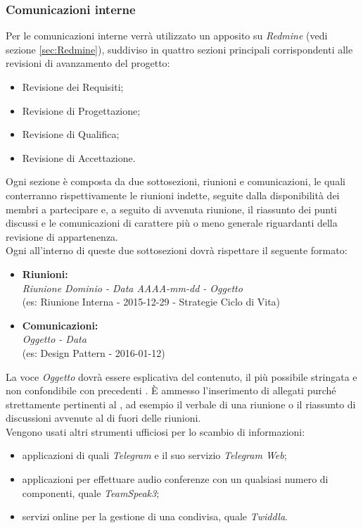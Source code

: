 \documentclass{scalatekids-article}
\begin{document}
\subsubsection{Comunicazioni interne}
\label{sec:ComunicazioniInterne}
Per le comunicazioni interne verrà utilizzato un  apposito su
\textit{Redmine} (vedi sezione \ref{sec:Redmine}), suddiviso in quattro sezioni
principali corrispondenti alle revisioni di avanzamento del progetto:
\begin{itemize}
\item Revisione dei Requisiti;
\item Revisione di Progettazione;
\item Revisione di Qualifica;
\item Revisione di Accettazione.
\end{itemize}
Ogni sezione è composta da due sottosezioni, riunioni e comunicazioni, le quali
conterranno rispettivamente le riunioni indette, seguite dalla disponibilità dei
membri a partecipare e, a seguito di avvenuta riunione, il riassunto dei punti
discussi e le comunicazioni di carattere più o meno generale riguardanti
 della revisione di appartenenza.\\ Ogni  all'interno di
queste due sottosezioni dovrà rispettare il seguente formato:
\begin{itemize}
\item\textbf{Riunioni:}\\
  \textit{Riunione Dominio - Data AAAA-mm-dd - Oggetto}\\
  (es: Riunione Interna - 2015-12-29 - Strategie Ciclo di Vita)
\item\textbf{Comunicazioni:}\\
  \textit{Oggetto - Data}\\
  (es: Design Pattern - 2016-01-12)
\end{itemize}
La voce \textit{Oggetto} dovrà essere esplicativa del contenuto, il più
possibile stringata e non confondibile con precedenti . È ammesso
l'inserimento di allegati purché strettamente pertinenti al , ad
esempio il verbale di una riunione o il riassunto di discussioni avvenute al di
fuori delle riunioni.\\ Vengono usati altri strumenti ufficiosi per lo scambio
di informazioni:
\begin{itemize}
\item applicazioni di  quali \textit{Telegram} e il suo servizio \textit{Telegram Web};
\item applicazioni  per effettuare audio conferenze con un qualsiasi numero di componenti, quale \textit{TeamSpeak3};
\item servizi online per la gestione di una  condivisa, quale \textit{Twiddla}.
\end{itemize}
\end{document}
